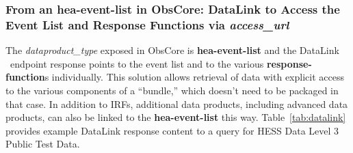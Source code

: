 \subsubsection{From an {\bf hea-event-list} in ObsCore: DataLink to Access the Event List and Response Functions via {\em access\_url\/}}
\label{sec:datalinkinobs}
The {\em dataproduct\_type\/} exposed in ObsCore is {\bf hea-event-list} and the Data\-Link \blinks\ endpoint response  points to the event list and to the various {\bf response-function}s individually. This solution allows retrieval of data with explicit access to the various  components  of a ``bundle,'' which doesn't need to be packaged in that case. In addition to \glspl{IRF}, additional data products, including advanced data products, can also be linked to the {\bf hea-event-list} this way.
Table~\ref{tab:datalink} provides example DataLink response content to a query for \gls{HESS} Data Level 3 Public Test Data.
%

